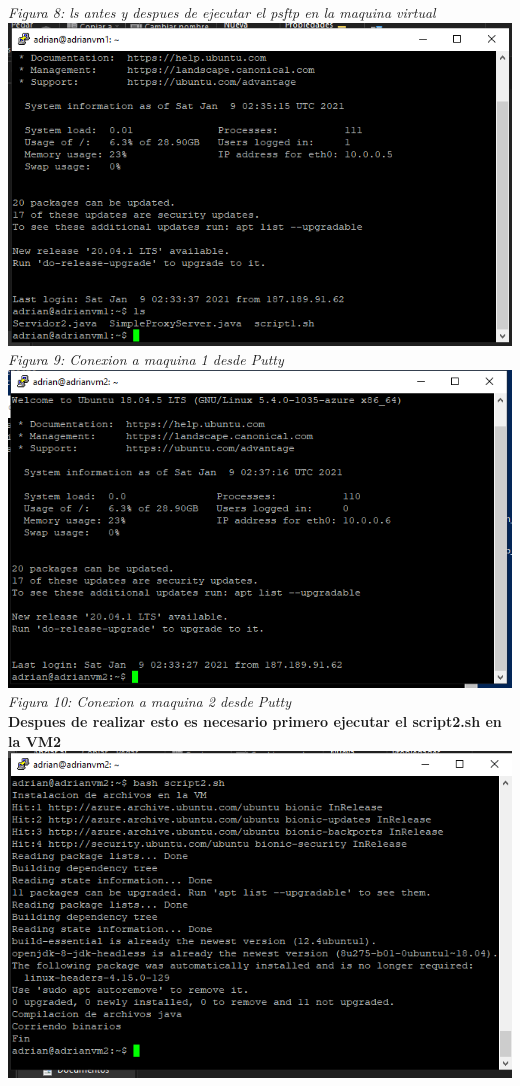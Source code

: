 \documentclass[10pt,executivepaper]{article}
\begin{document}
\begin{center}
  \textit{Figura 8: ls antes y despues de ejecutar el psftp en la maquina virtual}\\
  \includegraphics[scale=0.65]{imgs/vm_1.png}\\
  \textit{Figura 9: Conexion a maquina 1 desde Putty}\\
  \includegraphics[scale=0.65]{imgs/vm_2.png}\\
  \textit{Figura 10: Conexion a maquina 2 desde Putty}\\
  \textbf{Despues de realizar esto es necesario primero ejecutar el script2.sh en la VM2}\\
  \includegraphics[scale=0.65]{imgs/vm2_ex.png}\\

\end{center}
\end{document}
